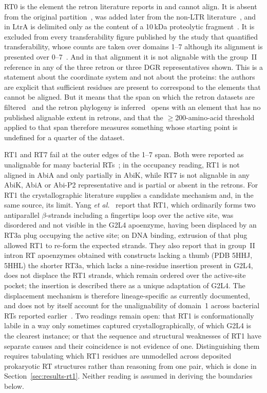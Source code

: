 RT0 is the element the retron literature reports in and cannot align. It is absent from
the original partition~\cite{xiong1990}, was added later from the non-LTR
literature~\cite{malik1999,zimmerly2001}, and in LtrA is delimited only as the content of
a 10\,kDa proteolytic fragment~\cite{blocker2005}. It is excluded from every
transferability figure published by the study that quantified transferability, whose
counts are taken over domains 1--7 although its alignment is presented over
0--7~\cite{simon2008}. And in that alignment it is not alignable with the group~II
reference in any of the three retron or three DGR representatives shown. This is a
statement about the coordinate system and not about the proteins: the authors are
explicit that sufficient residues are present to correspond to the elements that cannot
be aligned. But it means that the span on which the retron datasets are
filtered~\cite{toro2019} and the retron phylogeny is inferred~\cite{mestre2020} opens
with an element that has no published alignable extent in retrons, and that the
$\ge$200-amino-acid threshold applied to that span therefore measures something whose
starting point is undefined for a quarter of the dataset.

RT1 and RT7 fail at the outer edges of the 1--7 span. Both were reported as unalignable
for many bacterial RTs~\cite{simon2008}; in the occupancy reading, RT1 is not aligned in
AbiA and only partially in AbiK, while RT7 is not alignable in any AbiK, AbiA or Abi-P2
representative and is partial or absent in the retrons. For RT1 the crystallographic
literature supplies a candidate mechanism and, in the same source, its limit. Yang
\textit{et al.}~\cite{yang2025} report that RT1, which ordinarily forms two antiparallel
$\beta$-strands including a fingertips loop over the active site, was disordered and not
visible in the G2L4 apoenzyme, having been displaced by an RT3a plug occupying the active
site; on DNA binding, extrusion of that plug allowed RT1 to re-form the expected strands.
They also report that in group~II intron RT apoenzymes obtained with constructs lacking a
thumb (PDB 5HHJ, 5HHL) the shorter RT3a, which lacks a nine-residue insertion present in
G2L4, does not displace the RT1 strands, which remain ordered over the active-site
pocket; the insertion is described there as a unique adaptation of G2L4. The displacement
mechanism is therefore lineage-specific as currently documented, and does not by itself
account for the unalignability of domain~1 across bacterial RTs reported
earlier~\cite{simon2008}. Two readings remain open: that RT1 is conformationally labile
in a way only sometimes captured crystallographically, of which G2L4 is the clearest
instance; or that the sequence and structural weaknesses of RT1 have separate causes and
their coincidence is not evidence of one. Distinguishing them requires tabulating which
RT1 residues are unmodelled across deposited prokaryotic RT structures rather than
reasoning from one pair, which is done in Section~\ref{sec:results-rt1}. Neither reading
is assumed in deriving the boundaries below.

